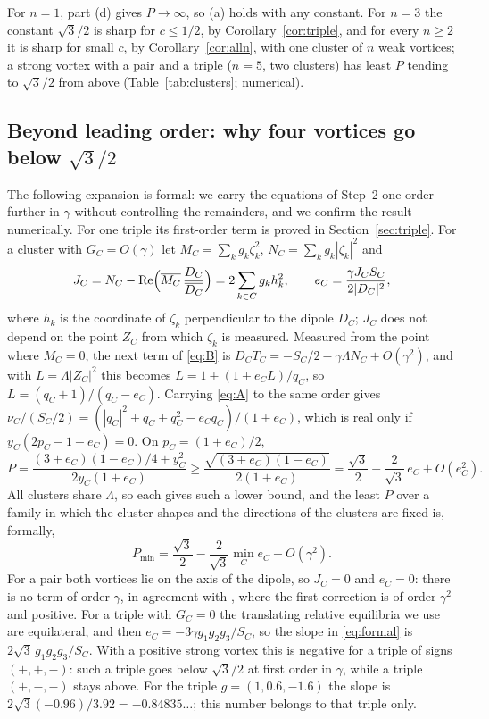 \documentclass[11pt]{article}
\theoremstyle{definition}
\newcommand{\re}{\operatorname{Re}}
\begin{document}
For $n = 1$, part (d) gives $P \to \infty$, so (a) holds with any constant. For $n = 3$ the constant $\sqrt{3}/2$ is sharp for $c \le 1/2$, by Corollary~\ref{cor:triple}, and for every $n \ge 2$ it is sharp for small $c$, by Corollary~\ref{cor:alln}, with one cluster of $n$ weak vortices; a strong vortex with a pair and a triple ($n = 5$, two clusters) has least $P$ tending to $\sqrt{3}/2$ from above (Table~\ref{tab:clusters}; numerical).

\subsection{Beyond leading order: why four vortices go below \texorpdfstring{$\sqrt{3}/2$}{sqrt(3)/2}}\label{sec:formal}

The following expansion is formal: we carry the equations of Step~2 one order further in $\gamma$ without controlling the remainders, and we confirm the result numerically. For one triple its first-order term is proved in Section~\ref{sec:triple}. For a cluster with $G_C = O(\gamma)$ let $M_C = \sum_k g_k\zeta_k^2$, $N_C = \sum_k g_k|\zeta_k|^2$ and
\[
  J_C = N_C - \re\Bigl(\overline{M_C}\,\frac{D_C}{\overline{D_C}}\Bigr) = 2\sum_{k \in C} g_kh_k^2, \qquad e_C = \frac{\gamma J_C S_C}{2|D_C|^2},
\]
where $h_k$ is the coordinate of $\zeta_k$ perpendicular to the dipole $D_C$; $J_C$ does not depend on the point $Z_C$ from which $\zeta_k$ is measured. Measured from the point where $M_C = 0$, the next term of \eqref{eq:B} is $D_CT_C = -S_C/2 - \gamma\Lambda N_C + O(\gamma^2)$, and with $L = \Lambda|Z_C|^2$ this becomes $L = 1 + (1 + e_CL)/q_C$, so $L = (q_C + 1)/(q_C - e_C)$. Carrying \eqref{eq:A} to the same order gives $\nu_C/(S_C/2) = (|q_C|^2 + \overline{q_C} + q_C^2 - e_Cq_C)/(1 + e_C)$, which is real only if $y_C(2p_C - 1 - e_C) = 0$. On $p_C = (1 + e_C)/2$,
\[
  P = \frac{(3 + e_C)(1 - e_C)/4 + y_C^2}{2y_C(1 + e_C)} \ge \frac{\sqrt{(3 + e_C)(1 - e_C)}}{2(1 + e_C)} = \frac{\sqrt{3}}{2} - \frac{2}{\sqrt{3}}\,e_C + O(e_C^2).
\]
All clusters share $\Lambda$, so each gives such a lower bound, and the least $P$ over a family in which the cluster shapes and the directions of the clusters are fixed is, formally,
\begin{equation}\label{eq:formal}
  P_{\min} = \frac{\sqrt{3}}{2} - \frac{2}{\sqrt{3}}\min_C e_C + O(\gamma^2).
\end{equation}
For a pair both vortices lie on the axis of the dipole, so $J_C = 0$ and $e_C = 0$: there is no term of order $\gamma$, in agreement with \cite[Proposition~4]{mw2026}, where the first correction is of order $\gamma^2$ and positive. For a triple with $G_C = 0$ the translating relative equilibria we use are equilateral, and then $e_C = -3\gamma g_1g_2g_3/S_C$, so the slope in \eqref{eq:formal} is $2\sqrt{3}\,g_1g_2g_3/S_C$. With a positive strong vortex this is negative for a triple of signs $(+,+,-)$: such a triple goes below $\sqrt{3}/2$ at first order in $\gamma$, while a triple $(+,-,-)$ stays above. For the triple $g = (1, 0.6, -1.6)$ the slope is $2\sqrt{3}(-0.96)/3.92 = -0.84835\ldots$; this number belongs to that triple only.
\end{document}
